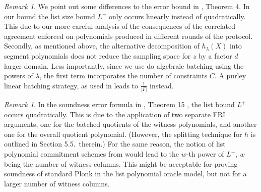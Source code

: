 \documentclass[11pt,article,oneside]{memoir}
\theoremstyle{definition}
\theoremstyle{remark}
\newtheorem{rem}[thm]{Remark}
\begin{document}
\begin{rem}
We point out some differences to the error bound in \cite{ethSTARK}, Theorem 4.
In our bound the list size bound $L^+$ only occurs linearly instead of quadratically. 
This due to our more careful analysis of the consequences of the correlated agreement enforced on polynomials produced in different rounds of the protocol. 
Secondly, as mentioned above, the alternative decomposition of $h_{\lambda}(X)$ into segment polynomials does not reduce the sampling space for $z$ by a factor $d$ larger domain.  
Less importantly, since we use do algebraic batching using the powers of $\lambda$, the first term incorporates the number of constraints $C$. 
A purley linear batching strategy, as used in \cite{ethSTARK} leads to $\frac{1}{|F|}$ instead.
\end{rem}

\begin{rem}
 In the soundness error formula in  \cite{DEEPFRI}, Theorem 15 , the list bound $L^+$ occurs quadratically. 
This is due to the application of two separate FRI arguments, one for the batched quotients of the witness polynomials, and another one for the overall quotient polynomial.  
(However, the splitting technique for $h$ is outlined in Section 5.5.~therein.)
For the same reason, the notion of list polynomial commitment schemes from \cite{Redshift} would lead to the  $w$-th power of $L^+$, $w$ being the number of witness columns.
This might be acceptable for proving soundness of standard Plonk in the list polynomial oracle model, but not for a larger number of witness columns. 
\end{rem}
\end{document}
